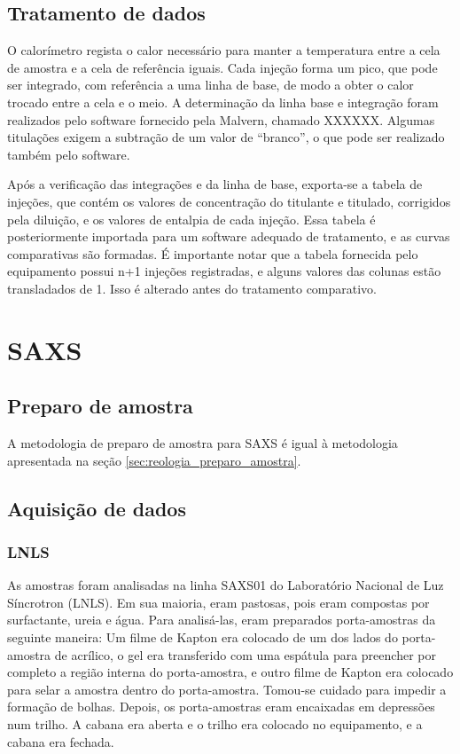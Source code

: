 				
		\section{Tratamento de dados}
		
		O calorímetro regista o calor necessário para manter a temperatura entre a cela de amostra e a cela de referência iguais. Cada injeção forma um pico, que pode ser integrado, com referência a uma linha de base, de modo a obter o calor trocado entre a cela e o meio. A determinação da linha base e integração foram realizados pelo software fornecido pela Malvern, chamado XXXXXX. Algumas titulações exigem a subtração de um valor de ``branco'', o que pode ser realizado também pelo software. %
		
		Após a verificação das integrações e da linha de base, exporta-se a tabela de injeções, que contém os valores de concentração do titulante e titulado, corrigidos pela diluição, e os valores de entalpia de cada injeção. Essa tabela é posteriormente importada para um software adequado de tratamento, e as curvas comparativas são formadas. É importante notar que a tabela fornecida pelo equipamento possui n+1 injeções registradas, e alguns valores das colunas estão transladados de 1. Isso é alterado antes do tratamento comparativo.
		
	\chapter{SAXS}
		\section{Preparo de amostra}
		
		A metodologia de preparo de amostra para SAXS é igual à metodologia apresentada na seção \ref{sec:reologia_preparo_amostra}.
		
		\section{Aquisição de dados}
			\subsection{LNLS}
			
			As amostras foram analisadas na linha SAXS01 do Laboratório Nacional de Luz Síncrotron (LNLS). Em sua maioria, eram pastosas, pois eram compostas por surfactante, ureia e água. Para analisá-las, eram preparados porta-amostras da seguinte maneira: Um filme de Kapton era colocado de um dos lados do porta-amostra de acrílico, o gel era transferido com uma espátula para preencher por completo a região interna do porta-amostra, e outro filme de Kapton era colocado para selar a amostra dentro do porta-amostra. Tomou-se cuidado para impedir a formação de bolhas. Depois, os porta-amostras eram encaixadas em depressões num trilho. A cabana era aberta e o trilho era colocado no equipamento, e a cabana era fechada. %
					
